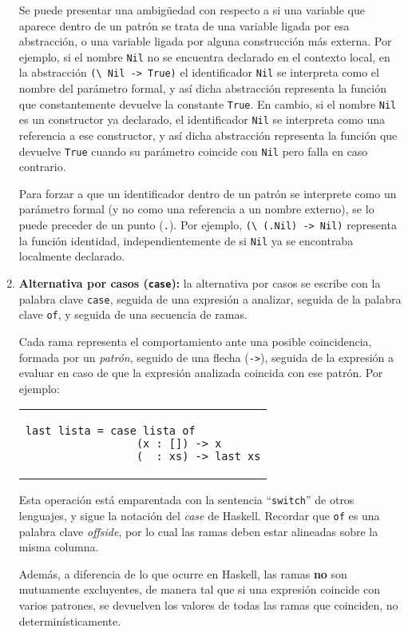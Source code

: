 \begin{enumerate}
  Se puede presentar una ambigüedad con respecto a si
  una variable que aparece dentro de un patrón
  se trata de una variable ligada por esa abstracción,
  o una variable ligada por alguna construcción más externa.
  Por ejemplo, si el nombre \verb|Nil| no se encuentra declarado
  en el contexto local,
  en la abstracción \verb|(\ Nil -> True)|
  el identificador \verb|Nil| se interpreta como el nombre del parámetro
  formal, y así dicha abstracción representa
  la función que constantemente devuelve la constante \verb|True|.
  En cambio, si el nombre \verb|Nil| es un constructor ya declarado,
  el identificador \verb|Nil| se interpreta como una referencia a ese
  constructor, y así dicha abstracción representa
  la función que devuelve \verb|True| cuando su parámetro
  coincide con \verb|Nil| pero falla en caso contrario.

  Para forzar a que un identificador dentro de un patrón se interprete
  como un parámetro formal (y no como una referencia a un nombre externo),
  se lo puede preceder de un punto (\verb|.|).
  Por ejemplo, \verb|(\ (.Nil) -> Nil)| representa la función identidad,
  independientemente de si \verb|Nil| ya se encontraba localmente declarado.
\item
  {\bf Alternativa por casos (\verb|case|):}
  la alternativa por casos se escribe con la palabra clave \verb|case|,
  seguida de una expresión a analizar, seguida de la palabra clave \verb|of|,
  y seguida de una secuencia de ramas.

  Cada rama representa el comportamiento ante una posible coincidencia,
  formada por un {\em patrón}, seguido de una flecha (\verb|->|),
  seguida de la expresión a evaluar en caso de que la expresión analizada
  coincida con ese patrón. Por ejemplo:
      \begin{center}
      \begin{tabular}{l}
      \begin{lstlisting}
last lista = case lista of
                 (x : []) -> x
                 (_ : xs) -> last xs
      \end{lstlisting}
      \end{tabular}
      \end{center}
  Esta operación está emparentada con la sentencia ``\verb|switch|'' de otros lenguajes,
  y sigue la notación del {\em case} de Haskell.
  Recordar que \verb|of| es una palabra clave {\em offside}, por lo cual
  las ramas deben estar alineadas sobre la misma columna.

  Además, a diferencia de lo que ocurre en Haskell, las ramas
  {\bf no} son mutuamente excluyentes, de manera tal que si una expresión
  coincide con varios patrones, se devuelven los valores de todas las
  ramas que coinciden, no determinísticamente.


\end{enumerate}
